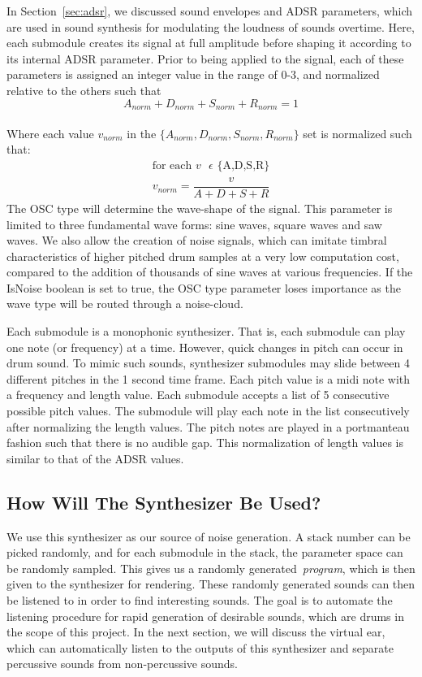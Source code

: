 \documentclass[\main/thesis.tex]{subfiles}
\begin{document}
In Section~\ref{sec:adsr}, we discussed sound envelopes and ADSR parameters, which are used in sound synthesis for modulating the loudness of sounds overtime. Here, each submodule creates its signal at full amplitude before shaping it according to its internal ADSR parameter. Prior to being applied to the signal, each of these parameters is assigned an integer value in the range of 0-3, and normalized relative to the others such that \[ A_{norm} + D_{norm} + S_{norm} + R_{norm} = 1 \] \\ 
Where each value $v_{norm}$ in the $\{A_{norm}, D_{norm},S_{norm},R_{norm}\} $ set is normalized such that:
\begin{align*}
\text{for each $v$ $\epsilon$ \{A,D,S,R\}} \\
v_{norm} = \dfrac{v}{A + D + S + R}
\end{align*}
 The OSC type will determine the wave-shape of the signal. This parameter is limited to three fundamental wave forms: sine waves, square waves and saw waves. We also allow the creation of noise signals, which can imitate timbral characteristics of higher pitched drum samples at a very low computation cost, compared to the addition of thousands of sine waves at various frequencies. If the IsNoise boolean is set to true, the OSC type parameter loses importance as the wave type will be routed through a noise-cloud. 

Each submodule is a monophonic synthesizer. That is, each submodule can play one note (or frequency) at a time. However, quick changes in pitch can occur in drum sound.  To mimic such sounds, synthesizer submodules may slide between 4 different pitches in the 1 second time frame. Each pitch value is a midi note with a frequency and length value. Each submodule accepts a list of 5 consecutive possible pitch values. The submodule will play each note in the list consecutively after normalizing the length values. The pitch notes are played in a portmanteau fashion such that there is no audible gap. This normalization of length values is similar to that of the ADSR values. 

\subsection{How Will The Synthesizer Be Used?}
We use this synthesizer as our source of noise generation. A stack number can be picked randomly, and for each submodule in the stack, the parameter space can be randomly sampled. This gives us a randomly generated~\textit{program}, which is then given to the synthesizer for rendering. These randomly generated sounds can then be listened to in order to find interesting sounds. The goal is to automate the listening procedure for rapid generation of desirable sounds, which are drums in the scope of this project. In the next section, we will discuss the virtual ear, which can automatically listen to the outputs of this synthesizer and separate percussive sounds from non-percussive sounds. 
\end{document}
